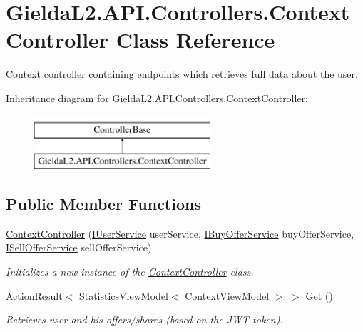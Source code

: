 \hypertarget{class_gielda_l2_1_1_a_p_i_1_1_controllers_1_1_context_controller}{}\section{Gielda\+L2.\+A\+P\+I.\+Controllers.\+Context\+Controller Class Reference}
\label{class_gielda_l2_1_1_a_p_i_1_1_controllers_1_1_context_controller}


Context controller containing endpoints which retrieves full data about the user.  


Inheritance diagram for Gielda\+L2.\+A\+P\+I.\+Controllers.\+Context\+Controller\+:\begin{figure}[H]
\begin{center}
\leavevmode
\includegraphics[height=2.000000cm]{class_gielda_l2_1_1_a_p_i_1_1_controllers_1_1_context_controller}
\end{center}
\end{figure}
\subsection*{Public Member Functions}
\begin{DoxyCompactItemize}
\item 
\mbox{\hyperlink{class_gielda_l2_1_1_a_p_i_1_1_controllers_1_1_context_controller_a3c1b21abd23a836215091e591112960e}{Context\+Controller}} (\mbox{\hyperlink{interface_gielda_l2_1_1_i_n_f_r_a_s_t_r_u_c_t_u_r_e_1_1_interfaces_1_1_i_user_service}{I\+User\+Service}} user\+Service, \mbox{\hyperlink{interface_gielda_l2_1_1_i_n_f_r_a_s_t_r_u_c_t_u_r_e_1_1_interfaces_1_1_i_buy_offer_service}{I\+Buy\+Offer\+Service}} buy\+Offer\+Service, \mbox{\hyperlink{interface_gielda_l2_1_1_i_n_f_r_a_s_t_r_u_c_t_u_r_e_1_1_interfaces_1_1_i_sell_offer_service}{I\+Sell\+Offer\+Service}} sell\+Offer\+Service)
\begin{DoxyCompactList}\small\item\em Initializes a new instance of the \mbox{\hyperlink{class_gielda_l2_1_1_a_p_i_1_1_controllers_1_1_context_controller}{Context\+Controller}} class. \end{DoxyCompactList}\item 
Action\+Result$<$ \mbox{\hyperlink{class_gielda_l2_1_1_a_p_i_1_1_view_models_1_1_view_1_1_statistics_view_model}{Statistics\+View\+Model}}$<$ \mbox{\hyperlink{class_gielda_l2_1_1_a_p_i_1_1_view_models_1_1_view_1_1_context_view_model}{Context\+View\+Model}} $>$ $>$ \mbox{\hyperlink{class_gielda_l2_1_1_a_p_i_1_1_controllers_1_1_context_controller_a4b273ae74e0c12a862fd6aa82307fbc9}{Get}} ()
\begin{DoxyCompactList}\small\item\em Retrieves user and his offers/shares (based on the J\+WT token). \end{DoxyCompactList}\end{DoxyCompactItemize}



